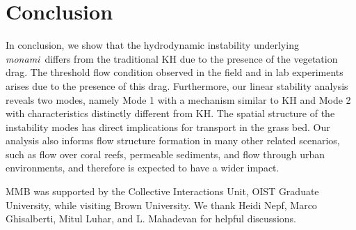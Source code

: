 \documentclass{jfm}
\newcommand{\monami}{\textit{monami}}
\begin{document}
\section{Conclusion}
In conclusion, we show that the hydrodynamic instability underlying \monami ~differs from the traditional KH due to the presence of the vegetation drag. 
The threshold flow condition observed in the field and in lab experiments arises due to the presence of this drag. 
Furthermore, our linear stability analysis reveals two modes, namely Mode 1 with a mechanism similar to KH and Mode 2 with characteristics distinctly different from KH. 
The spatial structure of the instability modes has direct implications for transport in the grass bed.
Our analysis also informs flow structure formation in many other related scenarios, such as flow over coral reefs, permeable sediments, and flow through urban environments, and therefore is expected to have a wider impact.

\acknowledgments
MMB was supported by the Collective Interactions Unit, OIST Graduate University, while visiting Brown University. We thank Heidi Nepf, Marco Ghisalberti, Mitul Luhar, and L. Mahadevan for helpful discussions.

{}

% 
%
\end{document}
